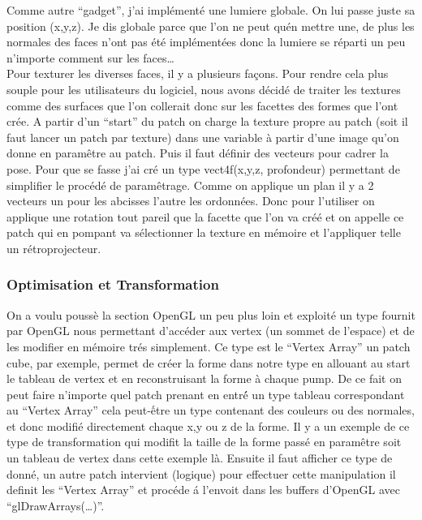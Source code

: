 Comme autre ``gadget'', j'ai impl\'ement\'e une lumiere globale. On lui passe 
juste sa position (x,y,z). Je dis globale parce que l'on ne peut qu\'en 
mettre une, 
de plus les normales des faces n'ont pas \'et\'e impl\'ement\'ees donc la 
lumiere 
se r\'eparti un peu n'importe comment sur les faces\ldots \\


Pour texturer les diverses faces, il y a plusieurs fa\c{c}ons. Pour rendre 
cela 
plus souple pour les utilisateurs du logiciel, nous avons d\'ecid\'e de 
traiter 
les textures comme des surfaces que l'on collerait donc sur les facettes des
 formes que l'ont cr\'ee. A partir d'un ``start'' du patch on charge la texture
 propre au patch (soit il faut lancer un patch par texture) dans une
 variable \`a
 partir d'une image qu'on donne en param\^etre au patch. Puis il faut d\'efinir
 des vecteurs pour cadrer la pose. Pour que se fasse j'ai cr\'e un type 
vect4f(x,y,z, profondeur)
 permettant de simplifier le proc\'ed\'e de param\^etrage. Comme on 
applique un plan
 il y a 2 vecteurs un pour les abcisses l'autre les ordonn\'ees. Donc
 pour l'utiliser on applique une rotation tout pareil que la facette que 
l'on va
 cr\'e\'e et on appelle ce patch qui en pompant va s\'electionner la texture
 en m\'emoire et l'appliquer telle un r\'etroprojecteur.



\subsubsection{Optimisation et Transformation}

On a voulu pouss\`e la section OpenGL un peu plus loin et exploit\'e un type 
fournit par OpenGL nous permettant d'accéder aux vertex (un sommet de 
l'espace) et de les modifier en m\'emoire tr\'es simplement. Ce type est le 
``Vertex Array'' un patch cube, par exemple, permet de cr\'eer la forme dans
 notre type en allouant au start le tableau de vertex et en reconstruisant la 
forme \`a chaque pump. De ce fait on peut faire n'importe quel patch prenant en
entr\'é un type tableau correspondant au ``Vertex Array'' cela peut-\'être un 
type contenant des couleurs ou des normales, et donc modifi\'e directement 
chaque x,y ou z de la forme. Il y a un exemple de ce type de transformation 
qui modifit la taille de la forme pass\'e en param\^etre soit un tableau de 
vertex dans cette exemple l\`a. Ensuite il faut afficher ce type de donn\'e, 
un autre patch intervient (logique) pour effectuer cette manipulation il 
definit les ``Vertex Array'' et proc\'ede \'a l'envoit dans les buffers 
d'OpenGL avec ``glDrawArrays(\ldots)''. 


